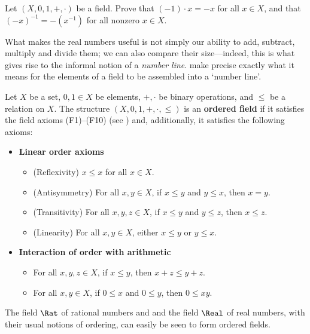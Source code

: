 \begin{exercise}
\label{exMinusOneSquaredIsOne}
Let $(X,0,1,+,{\cdot})$ be a field. Prove that $(-1) \cdot x = -x$ for all $x \in X$, and that $(-x)^{-1} = -(x^{-1})$ for all nonzero $x \in X$.
\end{exercise}

What makes the real numbers useful is not simply our ability to add, subtract, multiply and divide them; we can also compare their size---indeed, this is what gives rise to the informal notion of a \textit{number line}.  make precise exactly what it means for the elements of a field to be assembled into a `number line'.

\begin{axioms}
\label{axOrderedField}
Let $X$ be a set, $0,1 \in X$ be elements, $+,{\cdot}$ be binary operations, and $\le$ be a relation on $X$. The structure $(X,0,1,+,{\cdot},{\le})$ is an \textbf{ordered field} if it satisfies the field axioms (F1)--(F10) (see ) and, additionally, it satisfies the following axioms:
\begin{itemize}
\item \textbf{Linear order axioms}
\begin{itemize}[leftmargin=30pt]
\item[(PO1)] (Reflexivity) $x \le x$ for all $x \in X$.
\item[(PO2)] (Antisymmetry) For all $x,y \in X$, if $x \le y$ and $y \le x$, then $x=y$.
\item[(PO3)] (Transitivity) For all $x,y,z \in X$, if $x \le y$ and $y \le z$, then $x \le z$.
\item[(PO4)] (Linearity) For all $x,y \in X$, either $x \le y$ or $y \le x$.
\end{itemize}
\item \textbf{Interaction of order with arithmetic}
\begin{itemize}[leftmargin=30pt]
\item[(OF1)] For all $x,y,z \in X$, if $x \le y$, then $x+z \le y+z$.
\item[(OF2)] For all $x,y \in X$, if $0 \le x$ and $0 \le y$, then $0 \le xy$. 
\end{itemize}
\end{itemize}
\end{axioms}

\begin{example}
\label{exQRAreOrderedFields}
The field $\Rat$ of rational numbers and and the field $\Real$ of real numbers, with their usual notions of ordering, can easily be seen to form ordered fields.
\end{example}

